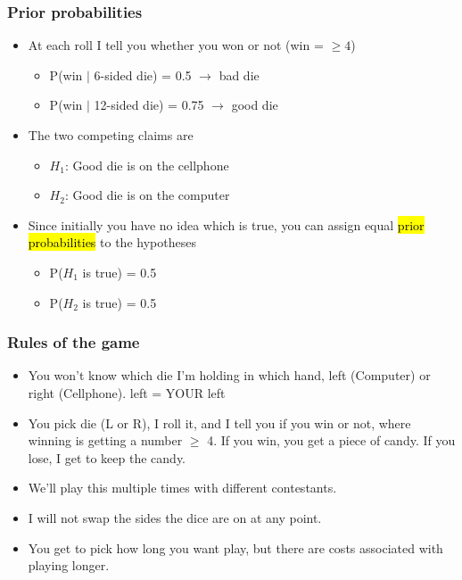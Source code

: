 \documentclass[slidestop,compress,mathserif,11pt,t,professionalfonts,xcolor=table]{beamer}
\begin{document}
\begin{frame}
\frametitle{Prior probabilities}

\begin{itemize}

\item At each roll I tell you whether you won or not (win = $\ge 4$)
\begin{itemize}
\item P(win $\mid$ 6-sided die) = 0.5 $\rightarrow$ bad die
\item P(win $\mid$ 12-sided die) = 0.75 $\rightarrow$ good die
\end{itemize}

\pause

\item The two competing claims are
\begin{itemize}
\item[] $H_1$: Good die is on the cellphone 
\item[] $H_2$: Good die is on the computer
\end{itemize}

\pause

\item Since initially you have no idea which is true, you can assign equal \hl{prior probabilities} to the hypotheses
\begin{itemize}
\item[] P($H_1$ is true) = 0.5 
\item[] P($H_2$ is true) = 0.5 
\end{itemize}

\end{itemize}

\end{frame}


\begin{frame}
\frametitle{Rules of the game}

\begin{itemize}

\item You won't know which die I'm holding in which hand, left (Computer) or right (Cellphone). {\footnotesize left = YOUR left}

\item You pick die (L or R), I roll it, and I tell you if you win or not, where winning is getting a number $\ge$ 4. If you win, you get a piece of candy. If you lose, I get to keep the candy.

\item We'll play this multiple times with different contestants.

\item I will not swap the sides the dice are on at any point.

\item You get to pick how long you want play, but there are costs associated with playing longer.

\end{itemize}

\end{frame}
\end{document}
